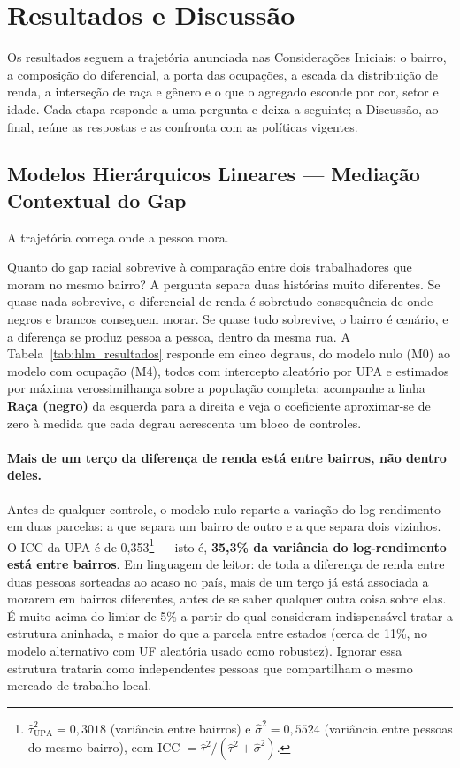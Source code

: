 \documentclass[11pt, a4paper, oneside]{article}
\begin{document}
\section*{Resultados e Discussão}

Os resultados seguem a trajetória anunciada nas Considerações Iniciais: o bairro, a composição do diferencial, a porta das ocupações, a escada da distribuição de renda, a interseção de raça e gênero e o que o agregado esconde por cor, setor e idade. Cada etapa responde a uma pergunta e deixa a seguinte; a Discussão, ao final, reúne as respostas e as confronta com as políticas vigentes.

\subsection*{Modelos Hierárquicos Lineares --- Mediação Contextual do Gap}
A trajetória começa onde a pessoa mora. \label{subsec:hlm_resultados}

Quanto do gap racial sobrevive à comparação entre dois trabalhadores que moram no
mesmo bairro? A pergunta separa duas histórias muito diferentes. Se quase nada
sobrevive, o diferencial de renda é sobretudo consequência de onde negros e brancos
conseguem morar. Se quase tudo sobrevive, o bairro é cenário, e a diferença se produz
pessoa a pessoa, dentro da mesma rua. A Tabela~\ref{tab:hlm_resultados} responde em
cinco degraus, do modelo nulo (M0) ao modelo com ocupação (M4), todos com intercepto
aleatório por UPA e estimados por máxima verossimilhança sobre a população completa:
acompanhe a linha \textbf{Raça (negro)} da esquerda para a direita e veja o coeficiente
aproximar-se de zero à medida que cada degrau acrescenta um bloco de controles.

\paragraph{Mais de um terço da diferença de renda está entre bairros, não dentro deles.}
Antes de qualquer controle, o modelo nulo reparte a variação do log-rendimento em duas
parcelas: a que separa um bairro de outro e a que separa dois vizinhos. O ICC da UPA é
de 0,353\footnote{$\hat\tau^2_{\text{UPA}} = 0,3018$ (variância entre
bairros) e $\hat\sigma^2 = 0,5524$ (variância entre pessoas do mesmo bairro), com
ICC $= \hat\tau^2/(\hat\tau^2+\hat\sigma^2)$.} --- isto é, \textbf{35,3\% da
variância do log-rendimento está entre bairros}. Em linguagem de leitor: de toda a
diferença de renda entre duas pessoas sorteadas ao acaso no país, mais de um terço já
está associada a morarem em bairros diferentes, antes de se saber qualquer outra coisa
sobre elas. É muito acima do limiar de 5\% a partir do qual 
consideram indispensável tratar a estrutura aninhada, e maior do que a parcela entre
estados (cerca de 11\%, no modelo alternativo com UF aleatória usado como robustez).
Ignorar essa estrutura trataria como independentes pessoas que compartilham o mesmo
mercado de trabalho local.
\end{document}
